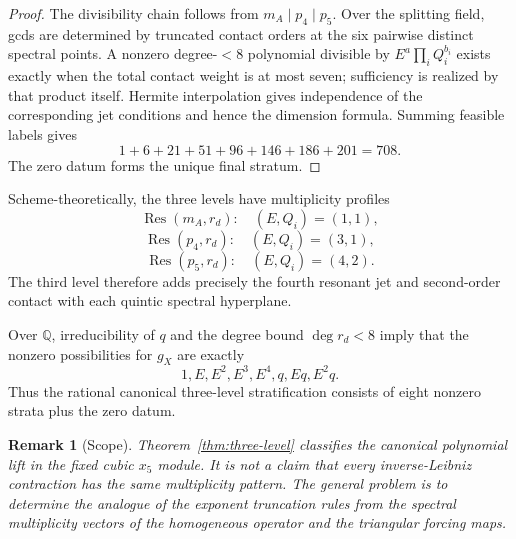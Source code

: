 \documentclass[11pt]{amsart}
\newtheorem{remark}[theorem]{Remark}
\newcommand{\Q}{\mathbb Q}
\begin{document}
\begin{proof}
The divisibility chain follows from $m_A\mid p_4\mid p_5$.  Over the splitting field, gcds are determined by truncated contact orders at the six pairwise distinct spectral points.  A nonzero degree-$<8$ polynomial divisible by $E^a\prod_iQ_i^{b_i}$ exists exactly when the total contact weight is at most seven; sufficiency is realized by that product itself.  Hermite interpolation gives independence of the corresponding jet conditions and hence the dimension formula.  Summing feasible labels gives
\[
1+6+21+51+96+146+186+201=708.
\]
The zero datum forms the unique final stratum.
\end{proof}

Scheme-theoretically, the three levels have multiplicity profiles
\[
\operatorname{Res}(m_A,r_d):\quad (E,Q_i)=(1,1),
\]
\[
\operatorname{Res}(p_4,r_d):\quad (E,Q_i)=(3,1),
\]
\[
\operatorname{Res}(p_5,r_d):\quad (E,Q_i)=(4,2).
\]
The third level therefore adds precisely the fourth resonant jet and second-order contact with each quintic spectral hyperplane.

Over $\Q$, irreducibility of $q$ and the degree bound $\deg r_d<8$ imply that the nonzero possibilities for $g_X$ are exactly
\[
1,
E,
E^2,
E^3,
E^4,
q,
Eq,
E^2q.
\]
Thus the rational canonical three-level stratification consists of eight nonzero strata plus the zero datum.

\begin{remark}[Scope]\label{rem:strat-scope}
Theorem~\ref{thm:three-level} classifies the canonical polynomial lift in the fixed cubic $x_5$ module.  It is not a claim that every inverse-Leibniz contraction has the same multiplicity pattern.  The general problem is to determine the analogue of the exponent truncation rules from the spectral multiplicity vectors of the homogeneous operator and the triangular forcing maps.
\end{remark}
\end{document}
